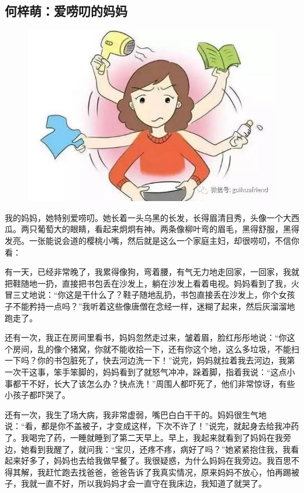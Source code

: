 \vspace{10pt}

{\centering\subsection*{何梓萌：爱唠叨的妈妈}}


\renewcommand{\leftmark}{何梓萌：爱唠叨的妈妈}

\begin{figure}[htbp]

\centering

\includegraphics[width = .5\textwidth]{./ch/10.jpg}

\end{figure}



我的妈妈，她特别爱唠叨。她长着一头乌黑的长发，长得眉清目秀，头像一个大西瓜。两只葡萄大的眼睛，看起来炯炯有神。两条像柳叶弯的眉毛，黑得舒服，黑得发亮。一张能说会道的樱桃小嘴，然后就是这么一个家庭主妇，却很唠叨，不信你看：

有一天，已经非常晚了，我累得像狗，弯着腰，有气无力地走回家，一回家，我就把鞋随地一扔，直接把书包丢在沙发上，躺在沙发上看着电视。妈妈看到了我，火冒三丈地说：“你这是干什么了？鞋子随地乱扔，书包直接丢在沙发上，你个女孩子不能矜持一点吗？”我听着这些像唐僧在念经一样，迷糊了起来，然后灰溜溜地跑走了。

还有一次，我正在房间里看书，妈妈忽然走过来，皱着眉，脸红彤彤地说：“你这个房间，乱的像个猪窝，你就不能收拾一下，还有你这个地，这么多垃圾，不能扫一下吗？你的书包脏死了，快去河边洗一下！”说完，妈妈就拉着我去河边，我第一次干这事，笨手笨脚的，妈妈看到了就怒气冲冲，跺着脚，指着我说：“这点小事都干不好，长大了该怎么办？快点洗！”周围人都吓死了，他们非常惊讶，有些小孩子都吓哭了。

还有一次，我生了场大病，我非常虚弱，嘴巴白白干干的。妈妈很生气地说：“看，都是你不盖被子，才变成这样，下次不许了！”说完，就起身去给我冲药了。我喝完了药，一睡就睡到了第二天早上。早上，我起来就看到了妈妈在我旁边，她看到我醒了，就问我：“宝贝，还疼不疼，病好了吗？”她紧紧抱住我，我看起来好多了，妈妈也去给我做早餐了。我很疑惑，为什么妈妈在我旁边。我百思不得其解，我赶忙跑去找爸爸，爸爸告诉了我真实情况，原来妈妈不放心，怕再踢被子，我就一直不好，所以我妈妈才会一直守在我床边，我知道了就哭了。

